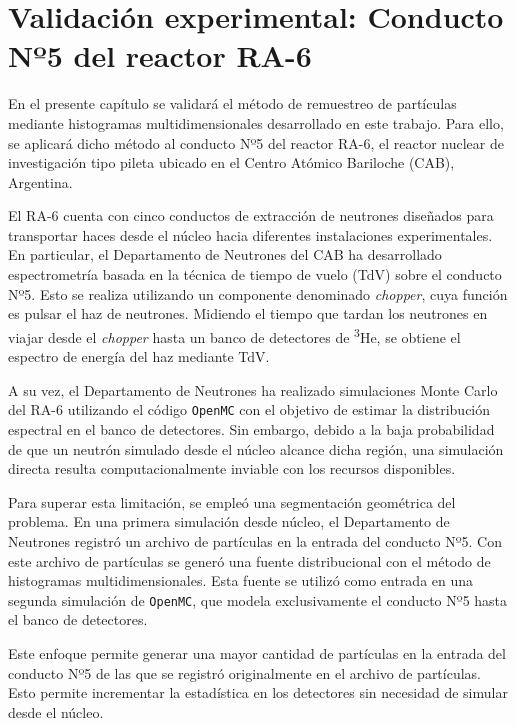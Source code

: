 \chapter{Validación experimental: Conducto Nº5 del reactor RA-6}

En el presente capítulo se validará el método de remuestreo de partículas mediante histogramas multidimensionales desarrollado en este trabajo. Para ello, se aplicará dicho método al conducto Nº5 del reactor RA-6, el reactor nuclear de investigación tipo pileta ubicado en el Centro Atómico Bariloche (CAB), Argentina.

El RA-6 cuenta con cinco conductos de extracción de neutrones diseñados para transportar haces desde el núcleo hacia diferentes instalaciones experimentales. En particular, el Departamento de Neutrones del CAB ha desarrollado espectrometría basada en la técnica de tiempo de vuelo (TdV) \cite{Schmidt2021Chopper} sobre el conducto Nº5. Esto se realiza utilizando un componente denominado \textit{chopper}, cuya función es pulsar el haz de neutrones. Midiendo el tiempo que tardan los neutrones en viajar desde el \textit{chopper} hasta un banco de detectores de \textsuperscript{3}He, se obtiene el espectro de energía del haz mediante TdV.

A su vez, el Departamento de Neutrones ha realizado simulaciones Monte Carlo del RA-6 utilizando el código \texttt{OpenMC} con el objetivo de estimar la distribución espectral en el banco de detectores. Sin embargo, debido a la baja probabilidad de que un neutrón simulado desde el núcleo alcance dicha región, una simulación directa resulta computacionalmente inviable con los recursos disponibles.

Para superar esta limitación, se empleó una segmentación geométrica del problema. En una primera simulación desde núcleo, el Departamento de Neutrones registró un archivo de partículas en la entrada del conducto Nº5. Con este archivo de partículas se generó una fuente distribucional con el método de histogramas multidimensionales. Esta fuente se utilizó como entrada en una segunda simulación de \texttt{OpenMC}, que modela exclusivamente el conducto Nº5 hasta el banco de detectores.

Este enfoque permite generar una mayor cantidad de partículas en la entrada del conducto Nº5 de las que se registró originalmente en el archivo de partículas. Esto permite incrementar la estadística en los detectores sin necesidad de simular desde el núcleo. 

